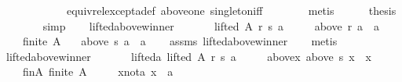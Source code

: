 \begin{isabellebody}
\ \ \ \ \ \ \ \ \ \ \ \ equiv{\isacharunderscore}{\kern0pt}rel{\isacharunderscore}{\kern0pt}except{\isacharunderscore}{\kern0pt}a{\isacharunderscore}{\kern0pt}def\ above{\isacharunderscore}{\kern0pt}one\ singleton{\isacharunderscore}{\kern0pt}iff\isanewline
\ \ \ \ \ \ \isamarkupfalse%
\ metis\isanewline
\ \ \ \ \isamarkupfalse%
\ {\isacharquery}{\kern0pt}thesis\isanewline
\ \ \ \ \ \ \isamarkupfalse%
\ simp\isanewline
\ \ \isamarkupfalse%
\isanewline
{}\isamarkupfalse%
%
\endisatagproof
{\isafoldproof}%
%
\isadelimproof
\isanewline
%
\endisadelimproof
\isanewline
{}\isamarkupfalse%
\ lifted{\isacharunderscore}{\kern0pt}above{\isacharunderscore}{\kern0pt}winner{}{\isacharcolon}{\kern0pt}\isanewline
\ \ \isanewline
\ \ \ \ {\isachardoublequoteopen}lifted\ A\ r\ s\ a{\isachardoublequoteclose}\ \isanewline
\ \ \ \ {\isachardoublequoteopen}above\ r\ a\ {\isacharequal}{\kern0pt}\ {\isacharbraceleft}{\kern0pt}a{\isacharbraceright}{\kern0pt}{\isachardoublequoteclose}\ \isanewline
\ \ \ \ {\isachardoublequoteopen}finite\ A{\isachardoublequoteclose}\isanewline
\ \ \ {\isachardoublequoteopen}above\ s\ a\ {\isacharequal}{\kern0pt}\ {\isacharbraceleft}{\kern0pt}a{\isacharbraceright}{\kern0pt}{\isachardoublequoteclose}\isanewline
%
\isadelimproof
\ \ %
\endisadelimproof
%
\isatagproof
{}\isamarkupfalse%
\ assms\ lifted{\isacharunderscore}{\kern0pt}above{\isacharunderscore}{\kern0pt}winner\isanewline
\ \ \isamarkupfalse%
\ metis%
\endisatagproof
{\isafoldproof}%
%
\isadelimproof
\isanewline
%
\endisadelimproof
\isanewline
{}\isamarkupfalse%
\ lifted{\isacharunderscore}{\kern0pt}above{\isacharunderscore}{\kern0pt}winner{}{\isacharcolon}{\kern0pt}\isanewline
\ \ \isanewline
\ \ \ \ lifted{\isacharunderscore}{\kern0pt}a{\isacharcolon}{\kern0pt}\ {\isachardoublequoteopen}lifted\ A\ r\ s\ a{\isachardoublequoteclose}\ \isanewline
\ \ \ \ above{\isacharunderscore}{\kern0pt}x{\isacharcolon}{\kern0pt}\ {\isachardoublequoteopen}above\ s\ x\ {\isacharequal}{\kern0pt}\ {\isacharbraceleft}{\kern0pt}x{\isacharbraceright}{\kern0pt}{\isachardoublequoteclose}\ \isanewline
\ \ \ \ fin{\isacharunderscore}{\kern0pt}A{\isacharcolon}{\kern0pt}\ {\isachardoublequoteopen}finite\ A{\isachardoublequoteclose}\ \isanewline
\ \ \ \ x{\isacharunderscore}{\kern0pt}not{\isacharunderscore}{\kern0pt}a{\isacharcolon}{\kern0pt}\ {\isachardoublequoteopen}x\ {\isasymnoteq}\ a{\isachardoublequoteclose}\isanewline

\end{isabellebody}
